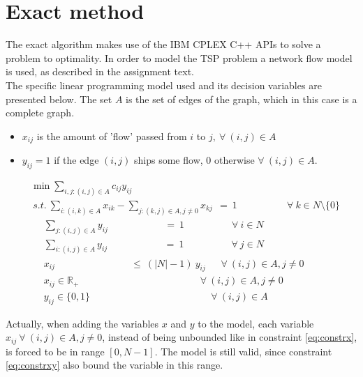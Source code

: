 \section{Exact method}
\label{chap:cplexm}
The exact algorithm makes use of the IBM CPLEX C++ APIs to solve a problem to optimality. In order to model the TSP problem a network flow model is used, as described in the assignment text. \\
The specific linear programming model used and its decision variables are presented below. The set $A$ is the set of edges of the graph, which in this case is a complete graph.
\begin{itemize}
	\item $x_{ij}$ is the amount of 'flow' passed from $i$ to $j,~\forall~(i,j)\in A$
	\item $y_{ij} = 1$ if the edge $(i,j)$ ships some flow, $0$ otherwise $\forall~(i,j)\in A$.
\end{itemize}
\begin{align}
	&\min \sum\limits_{i,j:(i,j)\in A} c_{ij}y_{ij}\\
	&~s.t.~\sum_{i:(i,k)\in A}x_{ik} - \sum_{j:(k,j)\in A, j\ne 0}x_{kj}~~=~1~~~~~~~~~~~~~~~~~~~~~~~\forall~k \in N \setminus \{0\}\label{eq:flow}\\
	&~~~~~~\sum_{j:(i,j)\in A} y_{ij}~~~~~~~~~~~~~~~~~~~~~~~~~~=~1~~~~~~~~~~~~~~~~~~~~~~\forall~i \in N \label{eq:sumi}\\
	&~~~~~~\sum_{i:(i,j)\in A} y_{ij}~~~~~~~~~~~~~~~~~~~~~~~~~~=~1~~~~~~~~~~~~~~~~~~~~~~\forall~j \in N \label{eq:sumj}\\ 
	&~~~~~~x_{ij}~~~~~~~~~~~~~~~~~~~~~~~~~~~~~~~~~~~\le~(|N|-1)~y_{ij}~~~~~~~\forall~(i,j) \in A,j\ne 0 \label{eq:constrxy}\\
	&~~~~~~x_{ij} \in \mathbb{R}_+~~~~~~~~~~~~~~~~~~~~~~~~~~~~~~~~~~~~~~~~~~~~~~~~~~~~~~~~\forall~(i,j) \in A,j\ne 0 \label{eq:constrx}\\
	&~~~~~~y_{ij} \in \{0,1\}~~~~~~~~~~~~~~~~~~~~~~~~~~~~~~~~~~~~~~~~~~~~~~~~~~~~~~~~\forall~(i,j) \in A
\end{align}

Actually, when adding the variables $x$ and $y$ to the model, each variable $x_{ij}~\forall~(i,j) \in A,j\ne 0$, instead of being unbounded like in constraint \ref{eq:constrx}, is forced to be in range $[0,N-1]$. The model is still valid, since constraint \ref{eq:constrxy} also bound the variable in this range.

